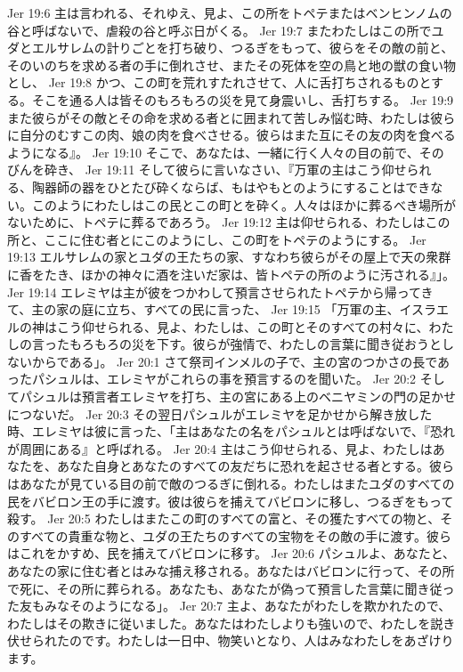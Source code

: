 Jer 19:6  主は言われる、それゆえ、見よ、この所をトペテまたはベンヒンノムの谷と呼ばないで、虐殺の谷と呼ぶ日がくる。
Jer 19:7  またわたしはこの所でユダとエルサレムの計りごとを打ち破り、つるぎをもって、彼らをその敵の前と、そのいのちを求める者の手に倒れさせ、またその死体を空の鳥と地の獣の食い物とし、
Jer 19:8  かつ、この町を荒れすたれさせて、人に舌打ちされるものとする。そこを通る人は皆そのもろもろの災を見て身震いし、舌打ちする。
Jer 19:9  また彼らがその敵とその命を求める者とに囲まれて苦しみ悩む時、わたしは彼らに自分のむすこの肉、娘の肉を食べさせる。彼らはまた互にその友の肉を食べるようになる』。
Jer 19:10  そこで、あなたは、一緒に行く人々の目の前で、そのびんを砕き、
Jer 19:11  そして彼らに言いなさい、『万軍の主はこう仰せられる、陶器師の器をひとたび砕くならば、もはやもとのようにすることはできない。このようにわたしはこの民とこの町とを砕く。人々はほかに葬るべき場所がないために、トペテに葬るであろう。
Jer 19:12  主は仰せられる、わたしはこの所と、ここに住む者とにこのようにし、この町をトペテのようにする。
Jer 19:13  エルサレムの家とユダの王たちの家、すなわち彼らがその屋上で天の衆群に香をたき、ほかの神々に酒を注いだ家は、皆トペテの所のように汚される』」。
Jer 19:14  エレミヤは主が彼をつかわして預言させられたトペテから帰ってきて、主の家の庭に立ち、すべての民に言った、
Jer 19:15  「万軍の主、イスラエルの神はこう仰せられる、見よ、わたしは、この町とそのすべての村々に、わたしの言ったもろもろの災を下す。彼らが強情で、わたしの言葉に聞き従おうとしないからである」。
Jer 20:1  さて祭司インメルの子で、主の宮のつかさの長であったパシュルは、エレミヤがこれらの事を預言するのを聞いた。
Jer 20:2  そしてパシュルは預言者エレミヤを打ち、主の宮にある上のベニヤミンの門の足かせにつないだ。
Jer 20:3  その翌日パシュルがエレミヤを足かせから解き放した時、エレミヤは彼に言った、「主はあなたの名をパシュルとは呼ばないで、『恐れが周囲にある』と呼ばれる。
Jer 20:4  主はこう仰せられる、見よ、わたしはあなたを、あなた自身とあなたのすべての友だちに恐れを起させる者とする。彼らはあなたが見ている目の前で敵のつるぎに倒れる。わたしはまたユダのすべての民をバビロン王の手に渡す。彼は彼らを捕えてバビロンに移し、つるぎをもって殺す。
Jer 20:5  わたしはまたこの町のすべての富と、その獲たすべての物と、そのすべての貴重な物と、ユダの王たちのすべての宝物をその敵の手に渡す。彼らはこれをかすめ、民を捕えてバビロンに移す。
Jer 20:6  パシュルよ、あなたと、あなたの家に住む者とはみな捕え移される。あなたはバビロンに行って、その所で死に、その所に葬られる。あなたも、あなたが偽って預言した言葉に聞き従った友もみなそのようになる」。
Jer 20:7  主よ、あなたがわたしを欺かれたので、わたしはその欺きに従いました。あなたはわたしよりも強いので、わたしを説き伏せられたのです。わたしは一日中、物笑いとなり、人はみなわたしをあざけります。
